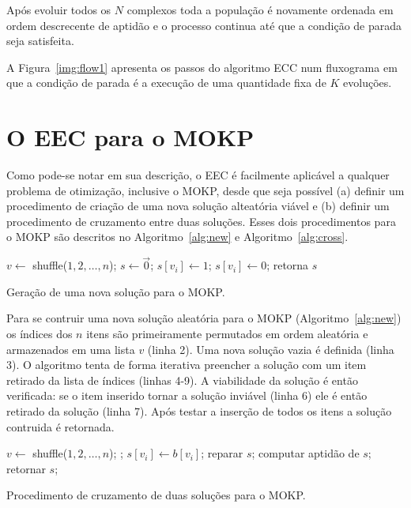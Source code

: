 Após evoluir todos os $N$ complexos toda a população é novamente ordenada
em ordem descrecente de aptidão e o processo continua até que a condição
de parada seja satisfeita.

A Figura~\ref{img:flow1} apresenta os passos do algoritmo ECC num fluxograma
em que a condição de parada é a execução de uma quantidade fixa de $K$ evoluções.


\section{O EEC para o MOKP}
Como pode-se notar em sua descrição, o EEC é facilmente aplicável a qualquer
problema de otimização, inclusive o MOKP, desde que seja possível (a) definir
um procedimento de criação de uma nova solução alteatória viável e (b) definir
um procedimento de cruzamento entre duas soluções.
Esses dois procedimentos para o MOKP são descritos no Algoritmo~\ref{alg:new}
e Algoritmo~\ref{alg:cross}.

\begin{algorithm}
  \begin{algorithmic}[1]
      \State $v \leftarrow $ shuffle($1, 2, \ldots, n$);
  	\State $s \leftarrow \vec{0}$; 
  	  \State $s[v_i] \leftarrow 1$; 
  	   
  	    \State $s[v_i] \leftarrow 0$;
        \EndIf
  	\EndFor
    \State retorna $s$
    \EndProcedure
  \end{algorithmic}
  \caption{Geração de uma nova solução para o MOKP.}
  \label{alg:new}
\end{algorithm}

Para se contruir uma nova solução aleatória para o MOKP (Algoritmo~\ref{alg:new})
os índices dos $n$ itens são primeiramente permutados em ordem aleatória e
armazenados em uma lista $v$ (linha 2).
Uma nova solução vazia é definida (linha 3).
O algoritmo tenta de forma iterativa preencher a solução com um item retirado
da lista de índices (linhas 4-9).
A viabilidade da solução é então verificada: se o item inserido tornar a solução
inviável (linha 6) ele é então retirado da solução (linha 7).
Após testar a inserção de todos os itens a solução contruida é retornada.

\begin{algorithm}
\begin{algorithmic}[1]
    \State $v \leftarrow $ shuffle($1, 2, \ldots, n$);
    ;
	  \State $s[v_i] \leftarrow b[v_i]$; 
	\EndFor
	  \State reparar $s$;
	\EndIf
	\State computar aptidão de $s$;
  \State retornar $s$;
  \EndProcedure
\end{algorithmic}
\caption{Procedimento de cruzamento de duas soluções para o MOKP.}
\label{alg:cross}
\end{algorithm}

